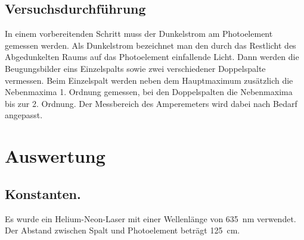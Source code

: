 \subsection{Versuchsdurchführung}
In einem vorbereitenden Schritt muss der Dunkelstrom am Photoelement gemessen werden.
Als Dunkelstrom bezeichnet man den durch das Restlicht des Abgedunkelten Raums auf das
Photoelement einfallende Licht. Dann werden die Beugungsbilder eins Einzelspalts
sowie zwei verschiedener Doppelspalte vermessen. Beim Einzelspalt werden neben dem
Hauptmaximum zusätzlich die Nebenmaxima 1. Ordnung gemessen, bei den Doppelspalten
die Nebenmaxima bis zur 2. Ordnung. Der Messbereich des Amperemeters wird dabei
nach Bedarf angepasst.
\section{Auswertung}
\subsection{Konstanten.}
Es wurde ein Helium-Neon-Laser mit einer Wellenlänge von \SI{635}{\nano\meter} verwendet.
Der Abstand zwischen Spalt und Photoelement beträgt \SI{125}{\centi\meter}.
